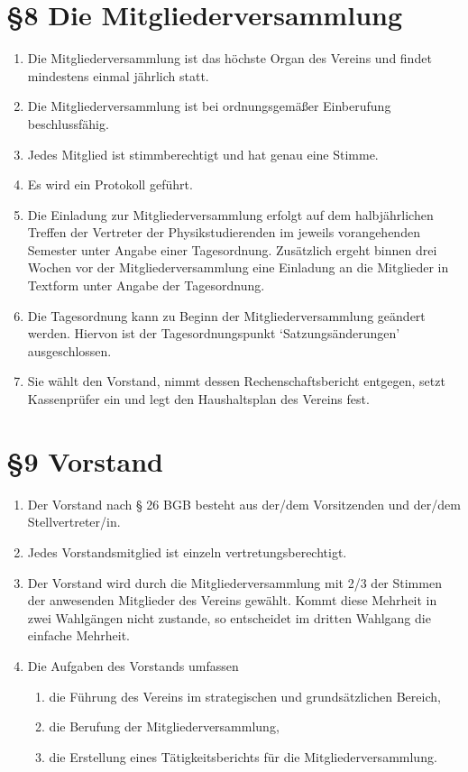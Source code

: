 \documentclass[ngerman]{article}
\begin{document}
\section*{§8 Die Mitgliederversammlung}
\begin{enumerate}
 \item Die Mitgliederversammlung ist das höchste Organ des Vereins und findet mindestens einmal jährlich statt.
 \item Die Mitgliederversammlung ist bei ordnungsgemäßer Einberufung beschlussfähig.
 \item Jedes Mitglied ist stimmberechtigt und hat genau eine Stimme.
 \item Es wird ein Protokoll geführt.
 \item Die Einladung zur Mitgliederversammlung erfolgt auf dem halbjährlichen Treffen der Vertreter der Physikstudierenden im jeweils vorangehenden Semester unter Angabe einer Tagesordnung. Zusätzlich ergeht binnen drei Wochen vor der Mitgliederversammlung eine Einladung an die Mitglieder in Textform unter Angabe der Tagesordnung.
 \item Die Tagesordnung kann zu Beginn der Mitgliederversammlung geändert werden. Hiervon ist der Tagesordnungspunkt `Satzungsänderungen' ausgeschlossen.
 \item Sie wählt den Vorstand, nimmt dessen Rechenschaftsbericht entgegen, setzt Kassenprüfer ein und legt den Haushaltsplan des Vereins fest.
\end{enumerate}


\section*{§9 Vorstand}
\begin{enumerate}
 \item Der Vorstand nach § 26 BGB besteht aus der/dem Vorsitzenden und der/dem Stellvertreter/in.
 \item Jedes Vorstandsmitglied ist einzeln vertretungsberechtigt.
 \item Der Vorstand wird durch die Mitgliederversammlung mit 2/3 der Stimmen der anwesenden Mitglieder des Vereins gewählt. Kommt diese Mehrheit in zwei Wahlgängen nicht zustande, so entscheidet im dritten Wahlgang die einfache Mehrheit.
 \item Die Aufgaben des Vorstands umfassen
  \begin{enumerate}
   \item die Führung des Vereins im strategischen und grundsätzlichen Bereich,
   \item die Berufung der Mitgliederversammlung,
   \item die Erstellung eines Tätigkeitsberichts für die Mitgliederversammlung.
  \end{enumerate}
\end{enumerate}
\end{document}

